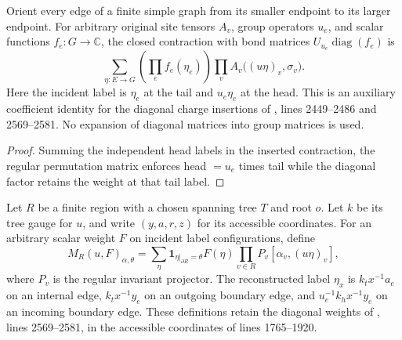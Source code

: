\begin{lemma}
    \label{thm:peps_regular_weighted_bond_contraction}
    \leanok
    Orient every edge of a finite simple graph from its smaller endpoint to
    its larger endpoint. For arbitrary original site tensors $A_v$, group
    operators $u_e$, and scalar functions $f_e:G\to\mathbb C$, the
    closed contraction with bond matrices $U_{u_e}\operatorname{diag}(f_e)$ is
    \[
        \sum_{\eta:E\to G}\left(\prod_e f_e(\eta_e)\right)
        \prod_v A_v\bigl((u\eta)_v,\sigma_v\bigr).
    \]
    Here the incident label is $\eta_e$ at the tail and $u_e\eta_e$ at
    the head. This is an auxiliary coefficient identity for the diagonal
    charge insertions of \cite{Schuch2010PEPS}, lines 2449--2486 and
    2569--2581. No expansion of diagonal matrices into group matrices is used.
\end{lemma}
\begin{proof}\leanok
    Summing the independent head labels in the inserted contraction,
    the regular permutation matrix enforces head $=u_e$ times tail while
    the diagonal factor retains the weight at that tail label.
\end{proof}

\begin{definition}
    \label{def:peps_regular_weighted_projector_contraction}
    \leanok
    Let $R$ be a finite region with a chosen spanning tree $T$ and root $o$.
    Let $k$ be its tree gauge for $u$, and write $(y,a,r,z)$ for its
    accessible coordinates. For an arbitrary scalar weight $F$ on incident
    label configurations, define
    \[
        M_R(u,F)_{\alpha,\theta}
        =\sum_\eta\mathbf1_{\eta|_{\partial R}=\theta}F(\eta)
        \prod_{v\in R}P_v[\alpha_v,(u\eta)_v],
    \]
    where $P_v$ is the regular invariant projector.
    The reconstructed label $\eta_x$ is $k_t x^{-1}a_e$ on an internal edge,
    $k_t x^{-1}y_e$ on an outgoing boundary edge, and
    $u_e^{-1}k_hx^{-1}y_e$ on an incoming boundary edge.
    These definitions retain the diagonal weights of
    \cite{Schuch2010PEPS}, lines 2569--2581, in the accessible coordinates
    of lines 1765--1920.
\end{definition}

